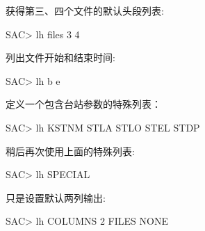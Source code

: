获得第三、四个文件的默认头段列表:
\begin{SACCode}
SAC> lh files 3 4
\end{SACCode}

列出文件开始和结束时间:
\begin{SACCode}
SAC> lh b e
\end{SACCode}

定义一个包含台站参数的特殊列表：
\begin{SACCode}
SAC> lh KSTNM STLA STLO STEL STDP
\end{SACCode}

稍后再次使用上面的特殊列表:
\begin{SACCode}
SAC> lh SPECIAL
\end{SACCode}

只是设置默认两列输出:
\begin{SACCode}
SAC> lh COLUMNS 2 FILES NONE
\end{SACCode}
